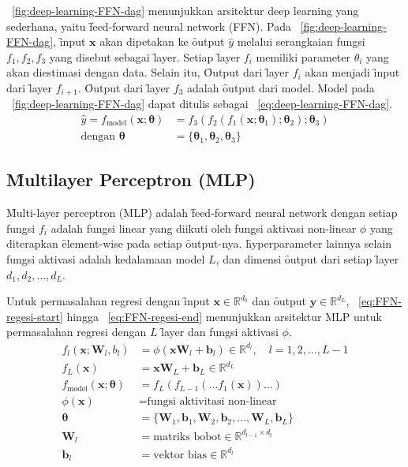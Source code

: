     \pic~\ref{fig:deep-learning-FFN-dag} menunjukkan arsitektur deep learning yang sederhana, yaitu \f{feed-forward neural network} (FFN). Pada \pic~\ref{fig:deep-learning-FFN-dag}, \f{input} $\mathbf{x}$ akan dipetakan ke \f{output} $\hat y$ melalui serangkaian fungsi $f_1, f_2, f_3$ yang disebut sebagai \f{layer}. Setiap \f{layer} $f_i$ memiliki parameter $\theta_i$ yang akan diestimasi dengan data. Selain itu, \f{Output} dari \f{layer} $f_i$ akan menjadi \f{input} dari \f{layer} $f_{i+1}$. \f{Output} dari \f{layer} $f_3$ adalah \f{output} dari model. Model pada \pic~\ref{fig:deep-learning-FFN-dag} dapat ditulis sebagai \equ~\ref{eq:deep-learning-FFN-dag}.
    \begin{align}
        \label{eq:deep-learning-FFN-dag}
        \hat y = f_{\text{model}}(\mathbf{x}; \bm{\theta}) &= f_3(f_2(f_1(\mathbf{x}; \bm{\theta}_1); \bm{\theta}_2); \bm{\theta}_3) \\
        \label{eq:deep-learning-FFN-dag-end}
        \text{dengan } \bm{\theta} &= \{\bm{\theta}_1, \bm{\theta}_2, \bm{\theta}_3\}
    \end{align}

    \subsection{\f{Multilayer Perceptron} (MLP)}

    \f{Multi-layer perceptron} (MLP) adalah \f{feed-forward neural network} dengan setiap fungsi $f_i$ adalah fungsi linear yang diikuti oleh fungsi aktivasi non-linear $\phi$  yang diterapkan \f{element-wise} pada setiap \f{output}-nya. \f{hyperparameter} lainnya selain fungsi aktivasi adalah kedalamaan model $L$, dan dimensi \f{output} dari setiap \f{layer} $d_1, d_2, \dots, d_L$.

    Untuk permasalahan regresi dengan \f{input} $\mathbf{x}\in \mathbb{R}^{d_0}$ dan \f{output} $\mathbf{y} \in \mathbb{R}^{d_L}$, \equ~\ref{eq:FFN-regesi-start} hingga \equ~\ref{eq:FFN-regesi-end} menunjukkan arsitektur MLP untuk permasalahan regresi dengan $L$ \f{layer} dan fungsi aktivasi $\phi$.
    \begin{align}
        \label{eq:FFN-regesi-start}
        f_l(\mathbf{x};\mathbf{W}_l, b_l) &= \phi( \mathbf{x} \mathbf{W}_l + \mathbf{b}_l) \in \mathbb{R}^{d_l}, \quad l = 1, 2, \dots, L-1 \\
        f_L(\mathbf{x}) &= \mathbf{x} \mathbf{W}_L + \mathbf{b}_L \in \mathbb{R}^{d_L} \\
        f_{\text{model}}(\mathbf{x};\bm{\theta}) &= f_L(f_{L-1}(\dots f_1(\mathbf{x})) \dots) \\
        \phi(\mathbf{x}) &= \text{fungsi aktivitasi non-linear} \\
        \bm{\theta} &= \{\mathbf{W}_1, \mathbf{b}_1, \mathbf{W}_2, \mathbf{b}_2, \dots, \mathbf{W}_L, \mathbf{b}_L\} \\
        \mathbf{W}_l &= \text{matriks bobot}  \in \mathbb{R}^{d_{l-1} \times d_l} \\
        \label{eq:FFN-regesi-end}
        \mathbf{b}_l &= \text{vektor bias} \in \mathbb{R}^{d_l}
    \end{align} 

